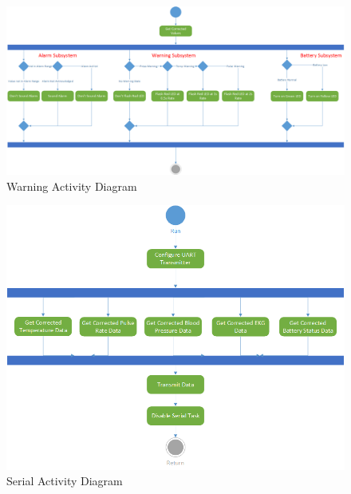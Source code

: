 \documentclass[12pt]{article} %
\begin{document}
    \begin{figure}[H]
      \centering
      \includegraphics[width=\textwidth]{../design/warning_activity.png}
      \caption{Warning Activity Diagram}
      \label{fig:warningActivity}
    \end{figure}

    \begin{figure}[H]
      \centering
      \includegraphics[width=\textwidth]{../design/serial_activity.png}
      \caption{Serial Activity Diagram}
      \label{fig:serialActivity}
    \end{figure}
\end{document}
